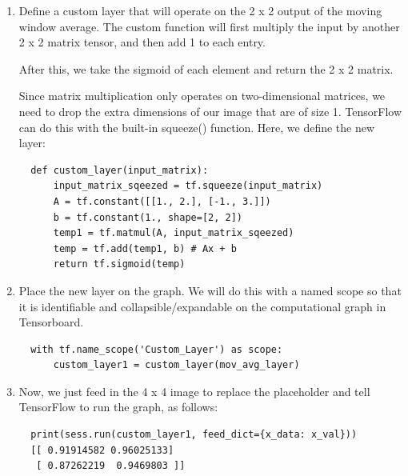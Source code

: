 \documentclass{article}
\begin{document}
\begin{enumerate}
  \item Define a custom layer that will operate on the 2 x 2 output of the moving window average. The custom function will first multiply the input by another 2 x 2 matrix tensor, and then add 1 to each entry.

  After this, we take the sigmoid of each element and return the 2 x 2 matrix.

  Since matrix multiplication only operates on two-dimensional matrices, we need to drop the extra dimensions of our image that are of size 1. TensorFlow can do this with the built-in squeeze() function. Here, we define the new layer:
  \begin{lstlisting}
  def custom_layer(input_matrix):
      input_matrix_sqeezed = tf.squeeze(input_matrix)
      A = tf.constant([[1., 2.], [-1., 3.]])
      b = tf.constant(1., shape=[2, 2])
      temp1 = tf.matmul(A, input_matrix_sqeezed)
      temp = tf.add(temp1, b) # Ax + b
      return tf.sigmoid(temp)
  \end{lstlisting}

  \item Place the new layer on the graph. We will do this with a named scope so that it is identifiable and collapsible/expandable on the computational graph in Tensorboard.
  \begin{lstlisting}
  with tf.name_scope('Custom_Layer') as scope:
      custom_layer1 = custom_layer(mov_avg_layer)
  \end{lstlisting}

  \item Now, we just feed in the 4 x 4 image to replace the placeholder and tell TensorFlow to run the graph, as follows:
  \begin{lstlisting}
  print(sess.run(custom_layer1, feed_dict={x_data: x_val}))
  [[ 0.91914582 0.96025133]
   [ 0.87262219  0.9469803 ]]
  \end{lstlisting}

\end{enumerate}
\end{document}
